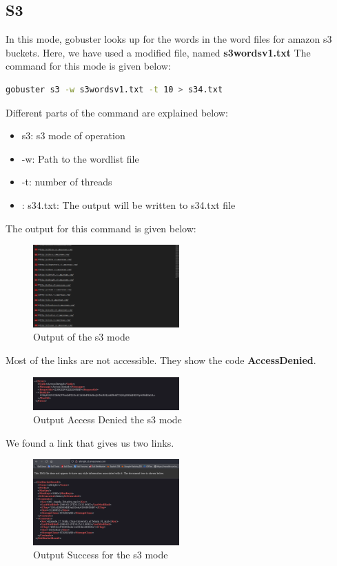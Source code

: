 \documentclass[12 pt]{article}
\begin{document}
\subsection{S3}
In this mode, gobuster looks up for the words in the word files for amazon s3 buckets. Here, we have used a modified file, named \textbf{s3wordsv1.txt} The command for this mode is given below:
\begin{lstlisting}[language=bash]
gobuster s3 -w s3wordsv1.txt -t 10 > s34.txt
\end{lstlisting}
Different parts of the command are explained below:
\begin{itemize}
    \item s3: s3 mode of operation
    \item -w: Path to the wordlist file
    \item -t: number of threads
    \item: s34.txt: The output will be written to s34.txt file
\end{itemize}
The output for this command is given below:
\begin{figure}[!htbp]
    \centering
    \includegraphics[width=0.5\textwidth]{s3_Output.png}
    \caption{Output of the s3 mode}
    \label{fig: s3 Output}
\end{figure}
\newline
Most of the links are not accessible. They show the code \textbf{AccessDenied}.
\begin{figure}[!htbp]
    \centering
    \includegraphics[width=0.5\textwidth]{s3_Output_Fail.png}
    \caption{Output Access Denied the s3 mode}
    \label{fig: s3 Output Access Denied}
\end{figure}
\newline
We found a link that gives us two links.
\begin{figure}[!htbp]
    \centering
    \includegraphics[width=0.5\textwidth]{s3_Output_Success.png}
    \caption{Output Success for the s3 mode}
    \label{fig: s3 Output Success}
\end{figure}
\end{document}
